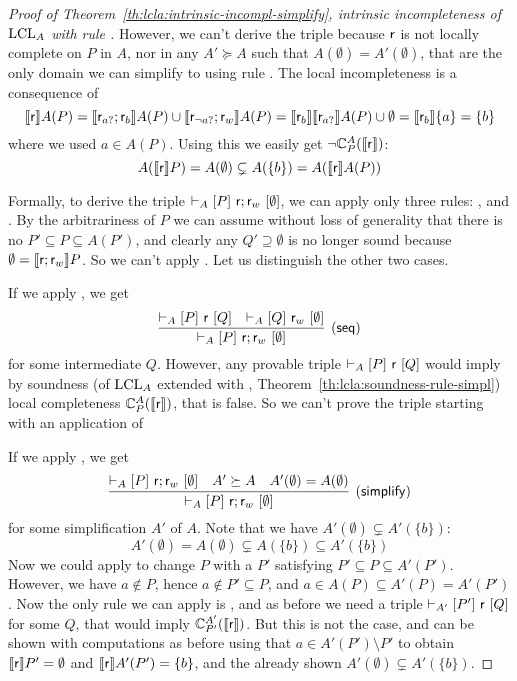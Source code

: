 \begin{proof}[Proof of Theorem~\ref{th:lcla:intrinsic-incompl-simplify}, intrinsic incompleteness of $\text{LCL}_A$ with rule ]
	However, we can't derive the triple because $\mathsf{r}$ is not locally complete on $P$ in $A$, nor in any $A' \succeq A$ such that $A(\emptyset) = A'(\emptyset)$, that are the only domain we can simplify to using rule . The local incompleteness is a consequence of
	\[
	\llbracket\mathsf{r}\rrbracket A(P) = \llbracket\mathsf{r}_{a?}; \mathsf{r}_{b}\rrbracket A(P) \cup \llbracket\mathsf{r}_{\lnot a?}; \mathsf{r}_w\rrbracket A(P) = \llbracket\mathsf{r}_{b}\rrbracket \llbracket\mathsf{r}_{a?}\rrbracket A(P) \cup \emptyset = \llbracket\mathsf{r}_{b}\rrbracket \{ a \} = \{ b \}
	\]
	where we used $a \in A(P)$. Using this we easily get $\lnot \mathbb{C}^{A}_{P}(\llbracket\mathsf{r}\rrbracket)$:
	\[
	A(\llbracket\mathsf{r}\rrbracket P) = A(\emptyset) \subsetneq A(\{ b \}) = A(\llbracket\mathsf{r}\rrbracket A(P))
	\]
	
	Formally, to derive the triple $\vdash_{A}\nobreak[P]~\mathsf{r}; \mathsf{r}_w~[\emptyset]$, we can apply only three rules: ,  and . By the arbitrariness of $P$ we can assume without loss of generality that there is no $P' \subseteq P \subseteq A(P')$, and clearly any $Q' \supseteq \emptyset$ is no longer sound because $\emptyset = \llbracket\mathsf{r}; \mathsf{r}_w\rrbracket P$. So we can't apply . Let us distinguish the other two cases.
	
	\noindent If we apply , we get
	\[
	\infer[(\mathsf{seq})]{\lcl{A}{P}{\regr; \regr_w}{\emptyset}}{\lcl{A}{P}{\regr}{Q} & \lcl{A}{Q}{\regr_w}{\emptyset}}
	\]
	for some intermediate $Q$. However, any provable triple $\vdash_{A}\nobreak[P]~\mathsf{r}~[Q]$ would imply by soundness (of $\text{LCL}_A$ extended with , Theorem~\ref{th:lcla:soundness-rule-simpl}) local completeness $\mathbb{C}^{A}_{P}(\llbracket\mathsf{r}\rrbracket)$, that is false. So we can't prove the triple starting with an application of 
	
	\noindent If we apply , we get
	\[
	\infer[(\mathsf{simplify})]{\lcl{A}{P}{\regr; \regr_w}{\emptyset}}{\lcl{A}{P}{\regr; \regr_w}{\emptyset} & A' \succeq A & A'(\emptyset) = A(\emptyset)}
	\]
	for some simplification $A'$ of $A$. Note that we have $A'(\emptyset) \subsetneq A'(\{ b \})$:
	\[
	A'(\emptyset) = A(\emptyset) \subsetneq A(\{ b \}) \subseteq A'(\{ b \})
	\]
	Now we could apply  to change $P$ with a $P'$ satisfying $P' \subseteq P \subseteq A'(P')$. However, we have $a \notin P$, hence $a \notin P' \subseteq P$, and $a \in A(P) \subseteq A'(P) = A'(P')$. Now the only rule we can apply is , and as before we need a triple $\vdash_{A'}\nobreak[P']~\mathsf{r}~[Q]$ for some $Q$, that would imply $\mathbb{C}^{A'}_{P'}(\llbracket\mathsf{r}\rrbracket)$. But this is not the case, and can be shown with computations as before using that $a \in A'(P') \setminus P'$ to obtain $\llbracket\mathsf{r}\rrbracket P' = \emptyset$ and $\llbracket\mathsf{r}\rrbracket A'(P') = \{ b \}$, and the already shown $A'(\emptyset) \subsetneq A'(\{ b \})$.
\end{proof}
